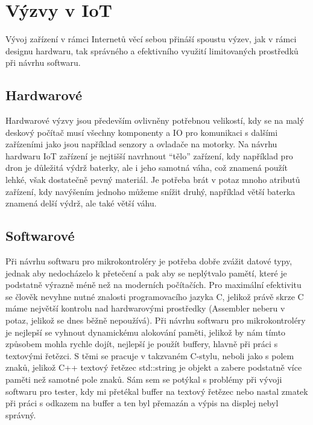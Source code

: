 
\section{Výzvy v IoT}
Vývoj zařízení v rámci Internetů věcí sebou přináší spoustu výzev, jak v rámci designu hardwaru, tak správného a efektivního využití limitovaných prostředků při návrhu softwaru. 

\subsection{Hardwarové}
Hardwarové výzvy jsou především ovlivněny potřebnou velikostí, kdy se na malý deskový počítač musí všechny komponenty a IO pro komunikaci s dalšími zařízeními jako jsou například senzory a ovladače na motorky. Na návrhu hardwaru IoT zařízení je nejtišší navrhnout “tělo” zařízení, kdy například pro dron je důležitá výdrž baterky, ale i jeho samotná váha, což znamená použít lehké, však dostatečně pevný materiál. Je potřeba brát v potaz mnoho atributů zařízení, kdy navýšením jednoho můžeme snížit druhý, například větší baterka znamená delší výdrž, ale také větší váhu.

\subsection{Softwarové}
Při návrhu softwaru pro mikrokontroléry je potřeba dobře zvážit datové typy, jednak aby nedocházelo k přetečení a pak aby se neplýtvalo pamětí, které je podstatně výrazně méně než na moderních počítačích. Pro maximální efektivitu se člověk nevyhne nutné znalosti programovacího jazyka C, jelikož právě skrze C máme největší kontrolu nad hardwarovými prostředky (Assembler neberu v potaz, jelikož se dnes běžně nepoužívá). Při návrhu softwaru pro mikrokontroléry je nejlepší se vyhnout dynamickému alokování paměti, jelikož by nám tímto způsobem mohla rychle dojít, nejlepší je použít buffery, hlavně při práci s textovými řetězci. S těmi se pracuje v takzvaném C-stylu, neboli jako s polem znaků, jelikož C++ textový řetězec std::string je objekt a zabere podstatně více paměti než samotné pole znaků. Sám sem se potýkal s problémy při vývoji softwaru pro tester, kdy mi přetékal buffer na textový řetězec nebo nastal zmatek při práci s odkazem na buffer a ten byl přemazán a výpis na displej nebyl správný.


